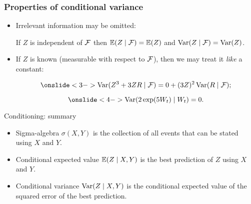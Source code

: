 \begin{frame}
    \frametitle{Properties of conditional variance}

    \begin{itemize}[<+->]
        \item Irrelevant information may be omitted:
        
        If $Z$ is \alert{independent} of $\mathcal{F}$ then $\mathbb{E}(Z \mid \mathcal{F}) = \mathbb{E}(Z)$ and $\operatorname{Var}(Z \mid \mathcal{F}) = \operatorname{Var}(Z)$.
        

        \item If $Z$ is \alert{known} (measurable with respect to $\mathcal{F}$), 
        then we may treat it \textit{like} a constant:
    
        \[
            \onslide<3->{\Var(Z^3  + 3Z R \mid \cF ) = 0 + (3Z)^2\Var(R \mid \cF);}
        \]
        
        \[
            \onslide<4->{\Var(2\exp(5W_t) \mid W_t) = 0.}
        \]
    
    \end{itemize}


\end{frame}


    \begin{frame}{Conditioning: summary}
    
    \begin{itemize}[<+->]
        \item Sigma-algebra $\sigma(X, Y)$ is the collection of all events that \alert{can be stated} using $X$ and $Y$.
        \item Conditional expected value $\mathbb{E}(Z \mid X, Y)$ is the \alert{best prediction} of $Z$ using $X$ and $Y$.
        \item Conditional variance $\operatorname{Var}(Z \mid X, Y)$ is the conditional expected value of the \alert{squared error} of the best prediction.
    \end{itemize}
      
    \end{frame}
    